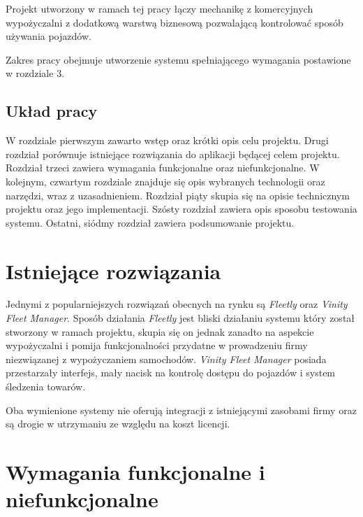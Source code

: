 \documentclass[eng,printmode,openany]{mgr}
\begin{document}
	Projekt utworzony w ramach tej pracy łączy mechanikę z komercyjnych wypożyczalni z dodatkową warstwą biznesową pozwalającą kontrolować sposób używania pojazdów.
	
	Zakres pracy obejmuje utworzenie systemu spełniającego wymagania postawione w rozdziale 3.
	
	\section{Układ pracy}
	W rozdziale pierwszym zawarto wstęp oraz krótki opis celu projektu. Drugi rozdział porównuje istniejące rozwiązania do aplikacji będącej celem projektu. Rozdział trzeci zawiera wymagania funkcjonalne oraz niefunkcjonalne. W kolejnym, czwartym rozdziale znajduje się opis wybranych technologii oraz narzędzi, wraz z uzasadnieniem. Rozdział piąty skupia się na opisie technicznym projektu oraz jego implementacji. Szósty rozdział zawiera opis sposobu testowania systemu. Ostatni, siódmy rozdział zawiera podsumowanie projektu.
	
	\newpage
	\chapter{Istniejące rozwiązania}
	Jednymi z popularniejszych rozwiązań obecnych na rynku są \textit{Fleetly} oraz \textit{Vinity Fleet Manager}. Sposób działania \textit{Fleetly} jest bliski działaniu systemu który został stworzony w ramach projektu, skupia się on jednak zanadto na aspekcie wypożyczalni i pomija funkcjonalności przydatne w prowadzeniu firmy niezwiązanej z wypożyczaniem samochodów. \textit{Vinity Fleet Manager} posiada przestarzały interfejs, mały nacisk na kontrolę dostępu do pojazdów i system śledzenia towarów. 
	
	Oba wymienione systemy nie oferują integracji z istniejącymi zasobami firmy oraz są drogie w utrzymaniu ze względu na koszt licencji.
	\newpage
	\chapter{Wymagania funkcjonalne i niefunkcjonalne}
\end{document}
